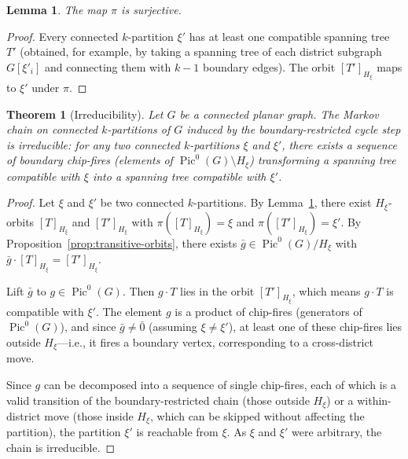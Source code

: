 \documentclass[11pt]{article}
\newtheorem{lemma}{Lemma}[section]
\newtheorem{theorem}{Theorem}[section]
\newcommand{\Pic}{\operatorname{Pic}^0}
\begin{document}
\begin{lemma}\label{lem:surjective}
The map $\pi$ is surjective.
\end{lemma}

\begin{proof}
Every connected $k$-partition $\xi'$ has at least one compatible spanning
tree $T'$ (obtained, for example, by taking a spanning tree of each district
subgraph $G[\xi'_i]$ and connecting them with $k-1$ boundary edges). The orbit
$[T']_{H_\xi}$ maps to $\xi'$ under $\pi$.
\end{proof}

\begin{theorem}[Irreducibility]\label{thm:irreducibility}
Let $G$ be a connected planar graph. The Markov chain on connected
$k$-partitions of $G$ induced by the boundary-restricted cycle step is
irreducible: for any two connected $k$-partitions $\xi$ and $\xi'$, there
exists a sequence of boundary chip-fires (elements of
$\Pic(G) \setminus H_\xi$) transforming a spanning tree compatible with $\xi$
into a spanning tree compatible with $\xi'$.
\end{theorem}

\begin{proof}
Let $\xi$ and $\xi'$ be two connected $k$-partitions. By
Lemma~\ref{lem:surjective}, there exist $H_\xi$-orbits $[T]_{H_\xi}$ and
$[T']_{H_\xi}$ with $\pi([T]_{H_\xi}) = \xi$ and
$\pi([T']_{H_\xi}) = \xi'$. By
Proposition~\ref{prop:transitive-orbits}, there exists
$\bar{g} \in \Pic(G)/H_\xi$ with
$\bar{g} \cdot [T]_{H_\xi} = [T']_{H_\xi}$.

Lift $\bar{g}$ to $g \in \Pic(G)$. Then $g \cdot T$ lies in the orbit
$[T']_{H_\xi}$, which means $g \cdot T$ is compatible with $\xi'$. The
element $g$ is a product of chip-fires (generators of $\Pic(G)$), and since
$\bar{g} \neq \bar{0}$ (assuming $\xi \neq \xi'$), at least one of these
chip-fires lies outside $H_\xi$---i.e., it fires a boundary vertex,
corresponding to a cross-district move.

Since $g$ can be decomposed into a sequence of single chip-fires, each of
which is a valid transition of the boundary-restricted chain (those outside
$H_\xi$) or a within-district move (those inside $H_\xi$, which can be
skipped without affecting the partition), the partition $\xi'$ is reachable
from $\xi$. As $\xi$ and $\xi'$ were arbitrary, the chain is irreducible.
\end{proof}
\end{document}
